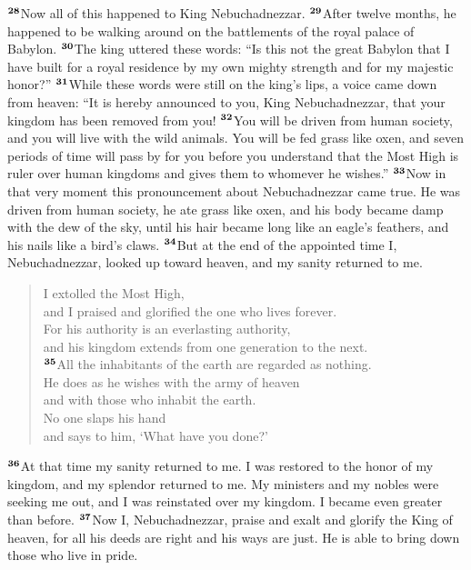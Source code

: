 \documentclass[12pt,a4paper,final]{article}
\renewcommand{\textsuperscript}[1]{\ensuremath{^{\textbf{\scriptsize #1}}}}
\begin{document}
\textsuperscript{28}Now all of this happened to King Nebuchadnezzar. \textsuperscript{29}After twelve months, he happened to be walking around on the battlements of the royal palace of Babylon. \textsuperscript{30}The king uttered these words: “Is this not the great Babylon that I have built for a royal residence by my own mighty strength and for my majestic honor?” \textsuperscript{31}While these words were still on the king’s lips, a voice came down from heaven: “It is hereby announced to you, King Nebuchadnezzar, that your kingdom has been removed from you! \textsuperscript{32}You will be driven from human society, and you will live with the wild animals. You will be fed grass like oxen, and seven periods of time will pass by for you before you understand that the Most High is ruler over human kingdoms and gives them to whomever he wishes.” 
\textsuperscript{33}Now in that very moment this pronouncement about Nebuchadnezzar came true. He was driven from human society, he ate grass like oxen, and his body became damp with the dew of the sky, until his hair became long like an eagle’s feathers, and his nails like a bird’s claws. 
\textsuperscript{34}But at the end of the appointed time I, Nebuchadnezzar, looked up toward heaven, and my sanity returned to me. 
\begin{quotation}

\noindent I extolled the Most High, \\
and I praised and glorified the one who lives forever.\\ 
For his authority is an everlasting authority, \\
and his kingdom extends from one generation to the next. \\
\textsuperscript{35}All the inhabitants of the earth are regarded as nothing. \\
He does as he wishes with the army of heaven \\
and with those who inhabit the earth. \\
No one slaps his hand \\
and says to him, ‘What have you done?’ \\

\end{quotation}
\textsuperscript{36}At that time my sanity returned to me. I was restored to the honor of my kingdom, and my splendor returned to me. My ministers and my nobles were seeking me out, and I was reinstated over my kingdom. I became even greater than before. \textsuperscript{37}Now I, Nebuchadnezzar, praise and exalt and glorify the King of heaven, for all his deeds are right and his ways are just. He is able to bring down those who live in pride. 
\end{document}

